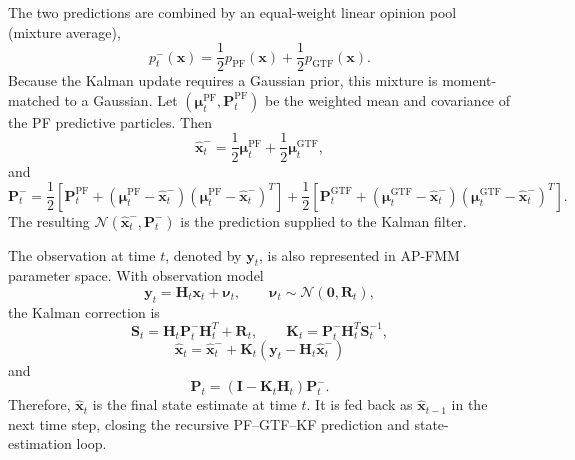 \documentclass[a4paper]{article}
\begin{document}
      The two predictions are combined by an equal-weight linear opinion pool (mixture average),
      \[
      p_t^{-}(\mathbf{x})
      =
      \frac{1}{2}p_{\mathrm{PF}}(\mathbf{x})
      +
      \frac{1}{2}p_{\mathrm{GTF}}(\mathbf{x}).
      \]
      Because the Kalman update requires a Gaussian prior, this mixture is moment-matched to a Gaussian. Let \((\boldsymbol{\mu}_{t}^{\mathrm{PF}},\mathbf{P}_{t}^{\mathrm{PF}})\) be the weighted mean and covariance of the PF predictive particles. Then
      \[
      \hat{\mathbf{x}}_{t}^{-}
      =
      \frac{1}{2}\boldsymbol{\mu}_{t}^{\mathrm{PF}}
      +
      \frac{1}{2}\boldsymbol{\mu}_{t}^{\mathrm{GTF}},
      \]
      and
      \[
      \mathbf{P}_{t}^{-}
      =
      \frac{1}{2}\!\left[
      \mathbf{P}_{t}^{\mathrm{PF}}
      +(\boldsymbol{\mu}_{t}^{\mathrm{PF}}-\hat{\mathbf{x}}_{t}^{-})
      (\boldsymbol{\mu}_{t}^{\mathrm{PF}}-\hat{\mathbf{x}}_{t}^{-})^{T}
      \right]
      +
      \frac{1}{2}\!\left[
      \mathbf{P}_{t}^{\mathrm{GTF}}
      +(\boldsymbol{\mu}_{t}^{\mathrm{GTF}}-\hat{\mathbf{x}}_{t}^{-})
      (\boldsymbol{\mu}_{t}^{\mathrm{GTF}}-\hat{\mathbf{x}}_{t}^{-})^{T}
      \right].
      \]
      The resulting \(\mathcal{N}(\hat{\mathbf{x}}_{t}^{-},\mathbf{P}_{t}^{-})\) is the prediction supplied to the Kalman filter.

      The observation at time \(t\), denoted by \(\mathbf{y}_t\), is also represented in AP-FMM parameter space. With observation model
      \[
      \mathbf{y}_t
      =
      \mathbf{H}_t\mathbf{x}_t+\boldsymbol{\nu}_t,
      \qquad
      \boldsymbol{\nu}_t\sim\mathcal{N}(\mathbf{0},\mathbf{R}_t),
      \]
      the Kalman correction is
      \[
      \mathbf{S}_t
      =
      \mathbf{H}_t\mathbf{P}_t^{-}\mathbf{H}_t^{T}+\mathbf{R}_t,
      \qquad
      \mathbf{K}_t
      =
      \mathbf{P}_t^{-}\mathbf{H}_t^{T}\mathbf{S}_t^{-1},
      \]
      \[
      \boxed{
      \hat{\mathbf{x}}_t
      =
      \hat{\mathbf{x}}_t^{-}
      +
      \mathbf{K}_t
      \left(
      \mathbf{y}_t-\mathbf{H}_t\hat{\mathbf{x}}_t^{-}
      \right)}
      \]
      and
      \[
      \mathbf{P}_t
      =
      (\mathbf{I}-\mathbf{K}_t\mathbf{H}_t)\mathbf{P}_t^{-}.
      \]
      Therefore, \(\hat{\mathbf{x}}_t\) is the final state estimate at time \(t\). It is fed back as \(\hat{\mathbf{x}}_{t-1}\) in the next time step, closing the recursive PF--GTF--KF prediction and state-estimation loop.

      
      
\end{document}

